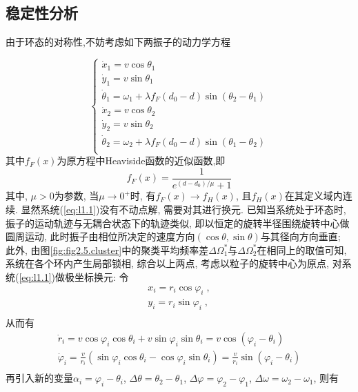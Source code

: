 \documentclass{article}
\begin{document}
\subsection{稳定性分析}
由于环态的对称性,不妨考虑如下两振子的动力学方程

\begin{equation}\label{eq:l1.1}
	\begin{cases}
		\dot{x}_1=v\cos \theta _1\\
		\dot{y}_1=v\sin \theta _1\\
		\dot{\theta}_1=\omega _1+\lambda f_F\left( d_0-d \right) \sin \left( \theta _2-\theta _1 \right)\\
		\dot{x}_2=v\cos \theta _2\\
		\dot{y}_2=v\sin \theta _2\\
		\dot{\theta}_2=\omega _2+\lambda f_F\left( d_0-d \right) \sin \left( \theta _1-\theta _2 \right)\\
	\end{cases}
\end{equation}
其中$f_{F}\left( x \right)$为原方程中Heaviside函数的近似函数,即
$$
f_F\left( x \right) =\frac{1}{e^{\left( d-d_0 \right) /\mu}+1}
$$
其中, $\mu>0$为参数, 当$\mu\rightarrow0^{+}$时, 有$f_{F}\left( x \right)\rightarrow f_H\left( x \right)$, 且$f_H(x)$在其定义域内连续. 显然系统(\ref{eq:l1.1})没有不动点解, 需要对其进行换元. 已知当系统处于环态时, 振子的运动轨迹与无耦合状态下的轨迹类似, 即以恒定的旋转半径围绕旋转中心做圆周运动, 此时振子由相位所决定的速度方向$(\cos\theta, \sin\theta)$与其径向方向垂直; 此外, 由图\ref{fig:fig2.5.cluster}中的聚类平均频率差$\Delta \Omega _{1}^{*}$与$\Delta \Omega _{2}^{*}$在相同上的取值可知, 系统在各个环内产生局部锁相, 综合以上两点, 考虑以粒子的旋转中心为原点, 对系统(\ref{eq:l1.1})做极坐标换元: 令
$$
\begin{array}{c}
	x_i=r_i\cos \varphi _i\;,\\
	y_i=r_i\sin \varphi _i\;,\\
\end{array}
$$
从而有
$$
\begin{array}{c}
	\dot{r}_i=v\cos \varphi _i\cos \theta _i+v\sin \varphi _i\sin \theta _i=v\cos \left( \varphi _i-\theta _i \right)\\
	\dot{\varphi}_i=\frac{v}{r_i}\left( \sin \varphi _i\cos \theta _i-\cos \varphi _i\sin \theta _i \right) =\frac{v}{r_i}\sin \left( \varphi _i-\theta _i \right)\\
\end{array}
$$
再引入新的变量$\alpha_i=\varphi_i-\theta_i$, $\Delta \theta =\theta _2-\theta _1$, $\Delta \varphi =\varphi _2-\varphi _1$, $\Delta \omega =\omega _2-\omega _1$, 则有
\end{document}
